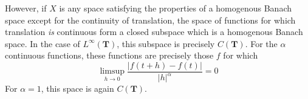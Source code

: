 However, if $X$ is any space satisfying the properties of a homogenous Banach space except for the continuity of translation, the space of functions for which translation {\it is} continuous form a closed subspace which is a homogenous Banach space. In the case of $L^\infty(\mathbf{T})$, this subspace is precisely $C(\mathbf{T})$. For the $\alpha$ continuous functions, these functions are precisely those $f$ for which
%
\[ \limsup_{h \to 0} \frac{|f(t+h) - f(t)|}{|h|^\alpha} = 0 \]
%
For $\alpha = 1$, this space is again $C(\mathbf{T})$.

